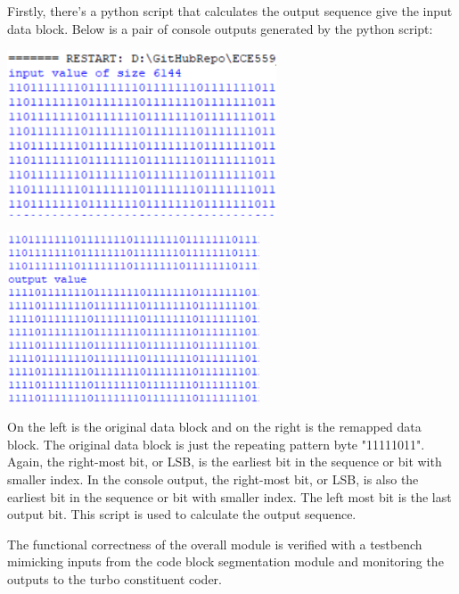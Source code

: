 \documentclass[letterpaper, 12pt]{article} %
\begin{document}
Firstly, there's a python script that calculates the output sequence give the input data block. Below is a pair of console outputs generated by the python script:
\begin{center}
\begin{minipage}{.49\textwidth}
\includegraphics[width=8cm, angle=0]{files/ci.png}
\centering
{}
\end{minipage}
\begin{minipage}{.49\textwidth}
\includegraphics[width=7.5cm, angle=0]{files/cpii.png}
\centering
{}
\centering
\end{minipage}
\end{center}
\bigskip

On the left is the original data block and on the right is the remapped data block. The original data block is just the repeating pattern byte "11111011". Again, the right-most bit, or LSB, is the earliest bit in the sequence or bit with smaller index. In the console output, the right-most bit, or LSB, is also the earliest bit in the sequence or bit with smaller index. The left most bit is the last output bit. This script is used to calculate the output sequence.\par
The functional correctness of the overall module is verified with a testbench mimicking inputs from the code block segmentation module and monitoring the outputs to the turbo constituent coder.\par
\end{document}
